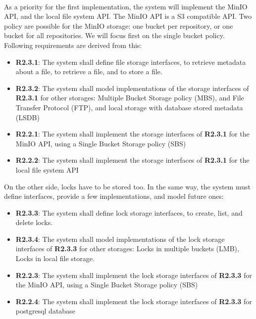 \paragraph{}
As a priority for the first implementation, the system will implement the MinIO API, and the local file system API. The MinIO API is a S3 compatible API. Two policy are possible for the MinIO storage: one bucket per repository, or one bucket for all repositories. We will focus first on the single bucket policy. Following requirements are derived from this:

\begin{itemize}
    \item \textbf{R2.3.1}: The system shall define file storage interfaces, to retrieve metadata about a file, to retrieve a file, and to store a file.
    \item \textbf{R2.3.2}: The system shall model implementations of the storage interfaces of \textbf{R2.3.1} for other storages: Multiple Bucket Storage policy (MBS), and File Transfer Protocol (FTP), and local storage with database stored metadata (LSDB)
    \item \textbf{R2.2.1}: The system shall implement the storage interfaces of \textbf{R2.3.1} for the MinIO API, using a Single Bucket Storage policy (SBS)
    \item \textbf{R2.2.2}: The system shall implement the storage interfaces of \textbf{R2.3.1} for the local file system API
\end{itemize}

On the other side, locks have to be stored too. In the same way, the system must define interfaces, provide a few implementations, and model future ones: 

\begin{itemize}
    \item \textbf{R2.3.3}: The system shall define lock storage interfaces, to create, list, and delete locks.
    \item \textbf{R2.3.4}: The system shall model implementations of the lock storage interfaces of \textbf{R2.3.3} for other storages: Locks in multiple buckets (LMB), Locks in local file storage.
    \item \textbf{R2.2.3}: The system shall implement the lock storage interfaces of \textbf{R2.3.3} for the MinIO API, using a Single Bucket Storage policy (SBS)
    \item \textbf{R2.2.4}: The system shall implement the lock storage interfaces of \textbf{R2.3.3} for postgresql database
\end{itemize}

